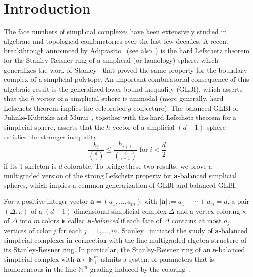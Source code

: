 \documentclass[11pt]{article}
\theoremstyle{definition}
\numberwithin{equation}{section}
\begin{document}
\section{Introduction}
The face numbers of simplicial complexes have been extensively studied in algebraic and topological combinatorics over the last few decades.
A recent breakthrough announced by Adiprasito~\cite{Adi} (see also~\cite{APP,KX,PP}) is the hard Lefschetz theorem for the Stanley-Reisner ring of a simplicial (or homology) sphere, which generalizes the work of Stanley~\cite{Sta80} that proved the same property for the boundary complex of a simplicial polytope.
An important combinatorial consequence of this algebraic result is the generalized lower bound inequality (GLBI), which asserts that the $h$-vector of a simplicial sphere is unimodal (more generally, hard Lefschetz theorem implies the celebrated $g$-conjecture).
The balanced GLBI of Juhnke-Kubitzke and Murai~\cite{JM}, together with the hard Lefschetz theorem for a simplicial sphere, asserts that the $h$-vector of a simplicial $(d-1)$-sphere satisfies the stronger inequality 
\begin{equation} \label{eq:balancedGLBI}
\frac{h_i}{\binom{d}{i}} \leq \frac{h_{i+1}}{\binom{d}{i+1}} \text{ for } i < \frac{d}{2}
\end{equation}
if its $1$-skeleton is $d$-colorable.
To bridge these two results, we prove a multigraded version of the strong Lefschetz property for $\bm{a}$-balanced simplicial spheres, which implies a common generalization of GLBI and balanced GLBI.

For a positive integer vector $\bm{a}=(a_1,\ldots,a_m)$ with $|\bm{a}|:=a_1+\cdots+a_m=d$, a pair $(\Delta,\kappa)$ of a $(d-1)$-dimensional simplicial complex $\Delta$ and a vertex coloring $\kappa$ of $\Delta$ into $m$ colors is called \emph{$\bm{a}$-balanced} if each face of $\Delta$ contains at most $a_j$ vertices of color $j$ for each $j=1,\ldots,m$.
Stanley~\cite{Sta79} initiated the study of $\bm{a}$-balanced simplicial complexes in connection with the fine multigraded algebra structure of its Stanley-Reisner ring.
In particular, the Stanley-Reisner ring of an $\bm{a}$-balanced simplicial complex with $\bm{a} \in \mathbb{N}_+^m$ admits a system of parameters that is homogeneous in the fine $\mathbb{N}^m$-grading induced by the coloring~\cite{Sta79}. 
\end{document}
